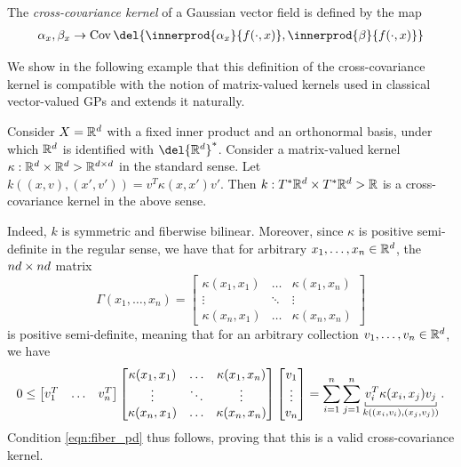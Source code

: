 \begin{definition}
	The \emph{cross-covariance kernel} of a Gaussian vector field is defined by the map
	\begin{align}
		\alpha_x, \beta_x \to \Cov \del{ \innerprod{\alpha_x}{f(\cdot, x)}, \innerprod{\beta}{f(\cdot, x)} }
	\end{align}
\end{definition}

We show in the following example that this definition of the cross-covariance kernel is compatible with the notion of matrix-valued kernels used in classical vector-valued GPs and extends it naturally.

\begin{example}
	Consider $X = \mathbb{R}^d$ with a fixed inner product and an orthonormal basis, under which $\mathbb{R}^d$ is identified with $\del{\R^d}^*$.
	Consider a matrix-valued kernel $\kappa: \mathbb{R}^d \times \mathbb{R}^d \-> \mathbb{R}^{d \times d}$ in the standard sense.
	Let $k((x, v), (x', v')) = v^T \kappa(x, x') v'$.
	Then $k: T^* \mathbb{R}^d \times T^* \mathbb{R}^d \-> \mathbb{R}$ is a cross-covariance kernel in the above sense.

	Indeed, $k$ is symmetric and fiberwise bilinear.
	Moreover, since $\kappa$ is positive semi-definite in the regular sense, we have that for arbitrary $x_1, \dots, x_n \in \mathbb{R}^d$, the $n d \times n d$ matrix \[ \Gamma(x_1, \dots, x_n) = \begin{bmatrix} \kappa(x_1, x_1) & \dots & \kappa(x_1, x_n) \\ \vdots & \ddots & \vdots \\ \kappa(x_n, x_1) & \dots & \kappa(x_n, x_n) \end{bmatrix} \] is positive semi-definite, meaning that for an arbitrary collection $v_1, \dots, v_n \in \mathbb{R}^d$, we have \[ 0 \leq \begin{bmatrix} v_1^T & \dots & v_n^T \end{bmatrix} \begin{bmatrix} \kappa(x_1, x_1) & \dots & \kappa(x_1, x_n) \\ \vdots & \ddots & \vdots \\ \kappa(x_n, x_1) & \dots & \kappa(x_n, x_n) \end{bmatrix} \begin{bmatrix} v_1 \\ \vdots \\ v_n \end{bmatrix} = \sum_{i=1}^n \sum_{j=1}^n \ubr{v_i^T \kappa(x_i, x_j) v_j}_{k((x_i, v_i), (x_j, v_j))}.
	\]
	Condition \ref{eqn:fiber_pd} thus follows, proving that this is a valid cross-covariance kernel.
\end{example}

